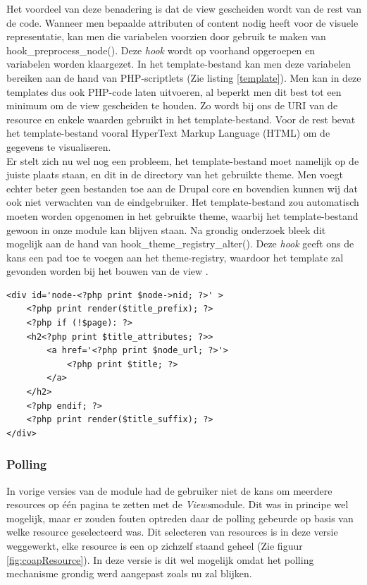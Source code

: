 Het voordeel van deze benadering is dat de view gescheiden wordt van de rest van de code. Wanneer men bepaalde attributen of content nodig heeft voor de visuele representatie, kan men die variabelen voorzien door gebruik te maken van hook\_preprocess\_node(). Deze \textit{hook} wordt op voorhand opgeroepen en variabelen worden klaargezet. In het template-bestand kan men deze variabelen bereiken aan de hand van PHP-scriptlets (Zie listing \ref{template}). Men kan in deze templates dus ook PHP-code laten uitvoeren, al beperkt men dit best tot een minimum om de view gescheiden te houden. Zo wordt bij ons de URI van de resource en enkele waarden gebruikt in het template-bestand. Voor de rest bevat het template-bestand vooral HyperText Markup Language (HTML)  om de gegevens te visualiseren.\\

Er stelt zich nu wel nog een probleem, het template-bestand moet namelijk op de juiste plaats staan, en dit in de directory van het gebruikte theme. Men voegt echter beter geen bestanden toe aan de Drupal core en bovendien kunnen wij dat ook niet verwachten van de eindgebruiker. Het template-bestand zou automatisch moeten worden opgenomen in het gebruikte theme, waarbij het template-bestand gewoon in onze module kan blijven staan. Na grondig onderzoek bleek dit mogelijk aan de hand van hook\_theme\_registry\_alter(). Deze \textit{hook} geeft ons de kans een pad toe te voegen aan het theme-registry, waardoor het template zal gevonden worden bij het bouwen van de view \cite{addTemplate}.

\lstset{language=HTML}
\begin{lstlisting}[label=template,caption=Voorbeeld van een template met PHP-scriptlets (node.tpl.php)]
<div id='node-<?php print $node->nid; ?>' >
	<?php print render($title_prefix); ?>
	<?php if (!$page): ?>
	<h2<?php print $title_attributes; ?>>
		<a href='<?php print $node_url; ?>'>
			<?php print $title; ?>
		</a>
	</h2>
	<?php endif; ?>
	<?php print render($title_suffix); ?>
</div>
\end{lstlisting}

\noindent

\subsubsection{Polling}\label{polling}
In vorige versies van de module had de gebruiker niet de kans om meerdere resources op \'{e}\'{e}n pagina te zetten met de \textit{Views}module. Dit was in principe wel mogelijk, maar er zouden fouten optreden daar de polling gebeurde op basis van welke resource geselecteerd was. Dit selecteren van resources is in deze versie weggewerkt, elke resource is een op zichzelf staand geheel (Zie figuur \ref{fig:coapResource}). In deze versie is dit wel mogelijk omdat het polling mechanisme grondig werd aangepast zoals nu zal blijken.\\


